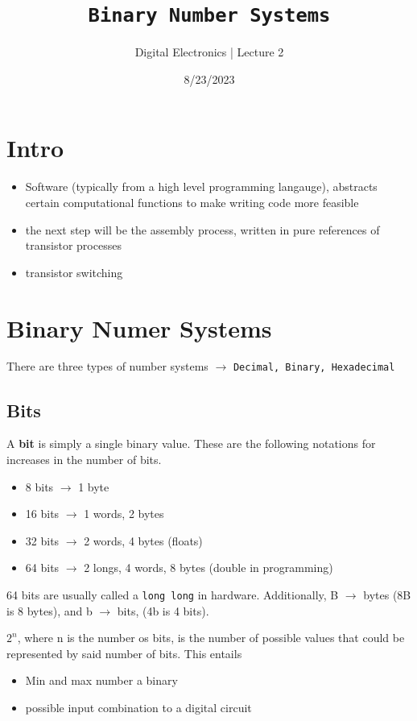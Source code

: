 \documentclass[a4paper,12pt]{article}
\title{\texttt{Binary Number Systems}\\\hrulefill}
\author{Digital Electronics | Lecture 2}
\date{8/23/2023}
\begin{document}
    \maketitle

    \section*{Intro}
    
    \begin{itemize}
        \item Software (typically from a high level programming langauge), abstracts certain computational functions to make writing code more feasible
        \item the next step will be the assembly process, written in pure references of transistor processes
        \item transistor switching 
    \end{itemize}
    \section*{Binary Numer Systems}
    There are three types of number systems $\rightarrow$ \texttt{Decimal, Binary, Hexadecimal}

    \subsection*{Bits}
        A \textbf{bit} is simply a single binary value. These are the following notations for increases in the number of bits.
        \begin{itemize}
            \item 8 bits $\rightarrow$ 1 byte
            \item 16 bits $\rightarrow$ 1 words, 2 bytes
            \item 32 bits $\rightarrow$ 2 words, 4 bytes (floats)
            \item 64 bits $\rightarrow$ 2 longs, 4 words, 8 bytes (double in programming)
        \end{itemize}
        64 bits are usually called a \texttt{long long} in hardware. Additionally, B $\rightarrow$ bytes (8B is 8 bytes), and b $\rightarrow$ bits, (4b is 4 bits).
        \par $2^n$, where n is the number os bits, is the number of possible values that could be represented by said number of bits. This entails
        \begin{itemize}
            \item Min and max number a binary
            \item possible input combination to a digital circuit
        \end{itemize}
\end{document}
